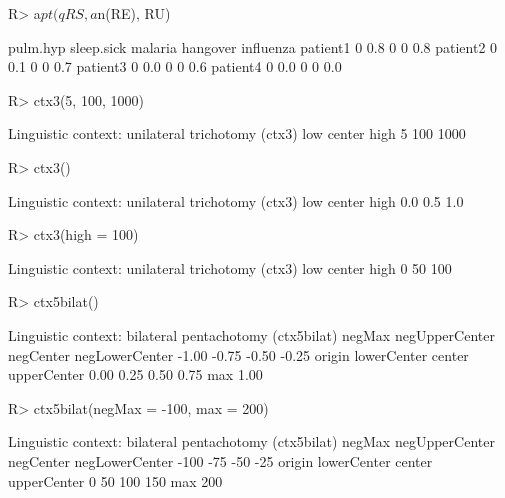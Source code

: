 \documentclass{article}\usepackage[]{graphicx}\usepackage[]{color}
\begin{document}
\begin{Schunk}
% --begin: "comp.quant.combined"
\begin{Sinput}
R> a$pt(qRS, a$n(RE), RU)
\end{Sinput}
\begin{Soutput}
         pulm.hyp sleep.sick malaria hangover influenza
patient1        0        0.8       0        0       0.8
patient2        0        0.1       0        0       0.7
patient3        0        0.0       0        0       0.6
patient4        0        0.0       0        0       0.0
\end{Soutput}
%
% --end: "comp.quant.combined"
\end{Schunk}

\begin{Schunk}
% --begin: "ctx"
\begin{Sinput}
R> ctx3(5, 100, 1000)
\end{Sinput}
\begin{Soutput}
Linguistic context: unilateral trichotomy (ctx3)
   low center   high 
     5    100   1000 
\end{Soutput}
\begin{Sinput}
R> ctx3()
\end{Sinput}
\begin{Soutput}
Linguistic context: unilateral trichotomy (ctx3)
   low center   high 
   0.0    0.5    1.0 
\end{Soutput}
\begin{Sinput}
R> ctx3(high = 100)
\end{Sinput}
\begin{Soutput}
Linguistic context: unilateral trichotomy (ctx3)
   low center   high 
     0     50    100 
\end{Soutput}
\begin{Sinput}
R> ctx5bilat()
\end{Sinput}
\begin{Soutput}
Linguistic context: bilateral pentachotomy (ctx5bilat)
        negMax negUpperCenter      negCenter negLowerCenter 
         -1.00          -0.75          -0.50          -0.25 
        origin    lowerCenter         center    upperCenter 
          0.00           0.25           0.50           0.75 
           max 
          1.00 
\end{Soutput}
\begin{Sinput}
R> ctx5bilat(negMax = -100, max = 200)
\end{Sinput}
\begin{Soutput}
Linguistic context: bilateral pentachotomy (ctx5bilat)
        negMax negUpperCenter      negCenter negLowerCenter 
          -100            -75            -50            -25 
        origin    lowerCenter         center    upperCenter 
             0             50            100            150 
           max 
           200 
\end{Soutput}
%
% --end: "ctx"
\end{Schunk}
\end{document}
